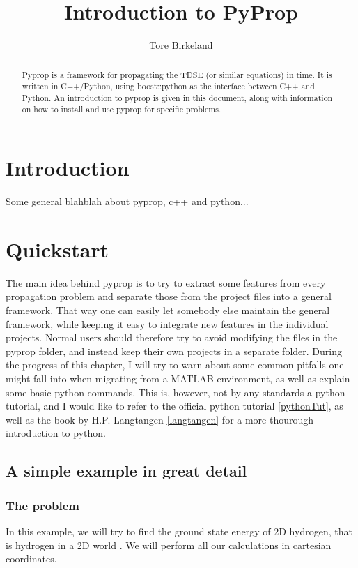 \documentclass[a4paper,12pt]{report}
\title{Introduction to PyProp}
\author{Tore Birkeland}
\begin{document}
\maketitle

\begin{abstract}
Pyprop is a framework for propagating the TDSE (or similar equations) in time. It is written in
C++/Python, using boost::python as the interface between C++ and Python. An introduction to pyprop 
is given in this document, along with information on how to install and use pyprop for
specific problems.
\end{abstract}

\chapter{Introduction}
Some general blahblah about pyprop, c++ and python...



\chapter{Quickstart}
The main idea behind pyprop is to try to extract some features from every propagation problem and 
separate those from the project files into a general framework. 
That way one can easily let somebody else maintain the general framework, while keeping it easy to
integrate new features in the individual projects. Normal users should therefore try to avoid
modifying the files in the pyprop folder, and instead keep their own projects in a separate folder. 
During the progress of this chapter, I will try to warn about some common pitfalls one might fall into
when migrating from a MATLAB environment, as well as explain some basic python commands. This is, however, 
not by any standards a python tutorial, and I would like to refer to the official python tutorial \ref{pythonTut},
as well as the book by H.P. Langtangen \ref{langtangen} for a more thourough introduction to python.

\section{A simple example in great detail}
\subsection{The problem}
In this example, we will try to find the ground state energy of 2D hydrogen, that is hydrogen in
a 2D world \cite[p.12]{leneray}. We will perform all our calculations in cartesian coordinates.
\end{document}
